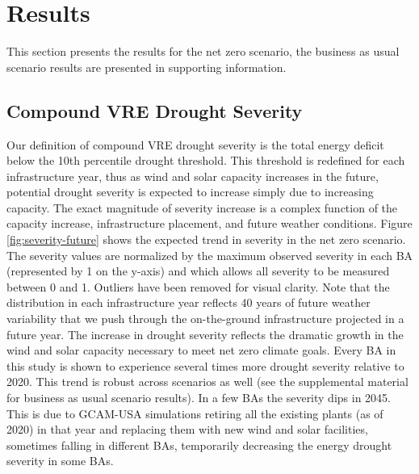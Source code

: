 \documentclass{agujournal2019}
\begin{document}
\section{Results}

This section presents the results for the net zero scenario, the business as usual scenario results are presented in supporting information. 

\subsection{Compound VRE Drought Severity}

Our definition of compound VRE drought severity is the total energy deficit below the 10th percentile drought threshold. This threshold is redefined for each infrastructure year, thus as wind and solar capacity increases in the future, potential drought severity is expected to increase simply due to increasing capacity. The exact magnitude of severity increase is a complex function of the capacity increase, infrastructure placement, and future weather conditions. Figure \ref{fig:severity-future} shows the expected trend in severity in the net zero scenario. The severity values are normalized by the maximum observed severity in each BA (represented by 1 on the y-axis) and which allows all severity to be measured between 0 and 1. Outliers have been removed for visual clarity. Note that the distribution in each infrastructure year reflects 40 years of future weather variability that we push through the on-the-ground infrastructure projected in a future year. The increase in drought severity reflects the dramatic growth in the wind and solar capacity necessary to meet net zero climate goals. Every BA in this study is shown to experience several times more drought severity relative to 2020. This trend is robust across scenarios as well (see the supplemental material for business as usual scenario results). In a few BAs the severity dips in 2045. This is due to GCAM-USA simulations retiring all the existing plants (as of 2020) in that year and replacing them with new wind and solar facilities, sometimes falling in different BAs, temporarily decreasing the energy drought severity in some BAs. 

\end{document}
